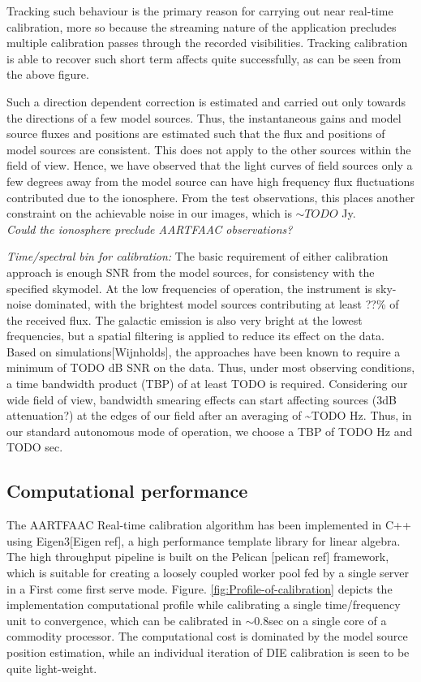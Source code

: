 \documentclass{aa}
\begin{document}
Tracking such behaviour is the primary reason for carrying out near
real-time calibration, more so because the streaming nature of the
application precludes multiple calibration passes through the recorded
visibilities. Tracking calibration is able to recover such short term
affects quite successfully, as can be seen from the above figure.

Such a direction dependent correction is estimated and carried out
only towards the directions of a few model sources. Thus, the instantaneous
gains and model source fluxes and positions are estimated such that
the flux and positions of model sources are consistent. This does
not apply to the other sources within the field of view. Hence, we
have observed that the light curves of field sources only a few degrees
away from the model source can have high frequency flux fluctuations
contributed due to the ionosphere. From the test observations, this
places another constraint on the achievable noise in our images, which
is $\sim TODO$ Jy.\\
\emph{ Could the ionosphere preclude AARTFAAC observations?}

\emph{Time/spectral bin for calibration: }The basic requirement of
either calibration approach is enough SNR from the model sources,
for consistency with the specified skymodel. At the low frequencies
of operation, the instrument is sky-noise dominated, with the brightest
model sources contributing at least ??\% of the received flux. The
galactic emission is also very bright at the lowest frequencies, but
a spatial filtering is applied to reduce its effect on the data. Based
on simulations{[}Wijnholds{]}, the approaches have been known to require
a minimum of TODO dB SNR on the data. Thus, under most observing conditions,
a time bandwidth product (TBP) of at least TODO is required. Considering
our wide field of view, bandwidth smearing effects can start affecting
sources (3dB attenuation?) at the edges of our field after an averaging
of \textasciitilde{}TODO Hz. Thus, in our standard autonomous mode
of operation, we choose a TBP of TODO Hz and TODO sec.


\subsection{\label{sub:Computational-performance}Computational performance}

The AARTFAAC Real-time calibration algorithm has been implemented
in C++ using Eigen3{[}Eigen ref{]}, a high performance template library
for linear algebra. The high throughput pipeline is built on the Pelican
{[}pelican ref{]} framework, which is suitable for creating a loosely
coupled worker pool fed by a single server in a First come first serve
mode. Figure. \ref{fig:Profile-of-calibration} depicts the implementation
computational profile while calibrating a single time/frequency unit
to convergence, which can be calibrated in $\sim$0.8sec on a single
core of a commodity processor. The computational cost is dominated
by the model source position estimation, while an individual iteration
of DIE calibration is seen to be quite light-weight.
\end{document}
